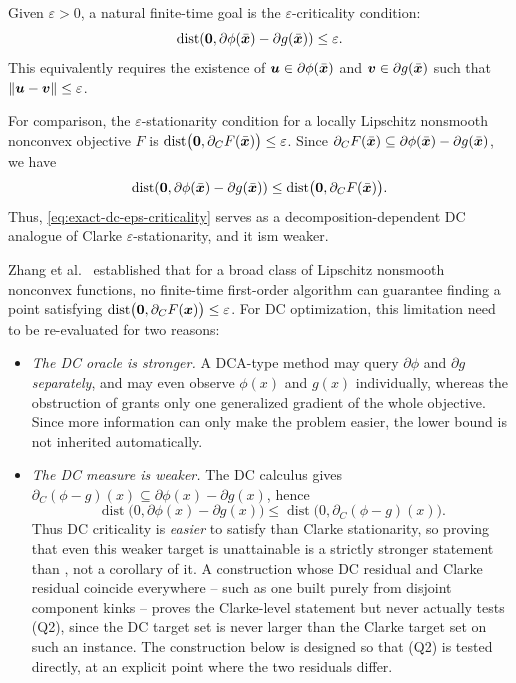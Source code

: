 \documentclass[english]{article}
\begin{document}
Given $\varepsilon>0$, a natural finite-time goal is the $\varepsilon$-criticality condition:
\begin{equation}
    \label{eq:exact-dc-eps-criticality}
    \operatorname{dist}\!\left( \bm{0}, \partial\phi(\bar{\bm{x}})-\partial g(\bar{\bm{x}}) \right) \le \varepsilon.
\end{equation}
This equivalently requires the existence of $\bm{u}\in\partial\phi(\bar{\bm{x}})$ and $\bm{v}\in\partial g(\bar{\bm{x}})$ such that $\|\bm{u}-\bm{v}\|\le \varepsilon$.

For comparison, the $\varepsilon$-stationarity condition for a locally Lipschitz nonsmooth nonconvex objective $F$ is $\operatorname{dist}\bigl(\bm{0},\partial_C F(\bar{\bm{x}})\bigr) \le \varepsilon$. Since $\partial_C F(\bar{\bm{x}}) \subseteq \partial\phi(\bar{\bm{x}})-\partial g(\bar{\bm{x}})$, we have
\[
    \operatorname{dist}\!\left( \bm{0}, \partial\phi(\bar{\bm{x}})-\partial g(\bar{\bm{x}}) \right) \le \operatorname{dist}\bigl(\bm{0},\partial_C F(\bar{\bm{x}})\bigr).
\]
Thus, \eqref{eq:exact-dc-eps-criticality} serves as a decomposition-dependent DC analogue of Clarke $\varepsilon$-stationarity, and it ism weaker.

Zhang et al.~\citep{Zhang-2020-Complexity} established that for a broad class of Lipschitz nonsmooth nonconvex functions, no finite-time first-order algorithm can guarantee finding a point satisfying $\operatorname{dist}\bigl(\bm{0},\partial_C F(\bm{x})\bigr) \le \varepsilon$. For DC optimization, this limitation need to be re-evaluated for two reasons:
\begin{itemize}
\item[(Q1)] \emph{The DC oracle is stronger.} A DCA-type method may
query $\partial\phi$ and $\partial g$ \emph{separately}, and may even
observe $\phi(x)$ and $g(x)$ individually, whereas the obstruction of
\citet[Theorem~5]{Zhang-2020-Complexity} grants only one generalized
gradient of the whole objective. Since more information can only make
the problem easier, the lower bound is not inherited automatically.
\item[(Q2)] \emph{The DC measure is weaker.} The DC calculus gives
$\partial_C(\phi-g)(x)\subseteq\partial\phi(x)-\partial g(x)$, hence
\[
 \operatorname{dist}\bigl(0,\partial\phi(x)-\partial g(x)\bigr)
 \le
 \operatorname{dist}\bigl(0,\partial_C(\phi-g)(x)\bigr).
\]
Thus DC criticality is \emph{easier} to satisfy than Clarke
stationarity, so proving that even this weaker target is unattainable is
a strictly stronger statement than
\citet[Theorem~5]{Zhang-2020-Complexity}, not a corollary of it. A
construction whose DC residual and Clarke residual coincide everywhere
-- such as one built purely from disjoint component kinks -- proves the
Clarke-level statement but never actually tests (Q2), since the DC
target set is never larger than the Clarke target set on such an
instance. The construction below is designed so that (Q2) is tested
directly, at an explicit point where the two residuals differ.
\end{itemize}
\end{document}
